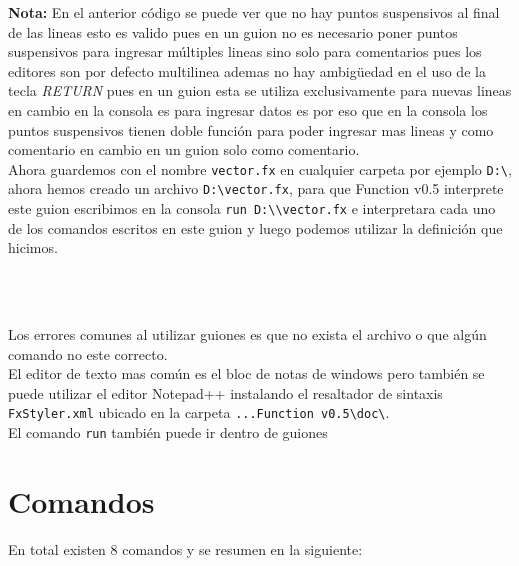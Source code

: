       {\bf Nota:} En el anterior código se puede ver que no hay puntos suspensivos al final de las lineas esto es valido pues en un guion no es necesario poner puntos suspensivos para ingresar múltiples lineas sino solo para comentarios pues los editores son por defecto multilinea ademas no hay ambigüedad en el uso de la tecla {\it RETURN} pues en un guion esta se utiliza exclusivamente para nuevas lineas en cambio en la consola es para ingresar datos es por eso que en la consola los puntos suspensivos tienen doble función para poder ingresar mas lineas y como comentario en cambio en un guion solo como comentario.
      \\
      
      Ahora guardemos con el nombre \texttt{vector.fx} en cualquier carpeta por ejemplo \texttt{D:\textbackslash}, ahora hemos creado un archivo \texttt{D:\textbackslash vector.fx}, para que Function v0.5 interprete este guion escribimos en la consola \texttt{run \textquotedbl D:\textbackslash\textbackslash vector.fx\textquotedbl} e interpretara cada uno de los comandos escritos en este guion y luego podemos utilizar la definición que hicimos.
      
      \begin{fxcode}
         \\
         \arrowcode{[13, 46, 3, 24] + [3, 34, 8, 39] - [7, 43, 5, 89]}\\
         \outcode{[9, 37, 6, -26]}
      \end{fxcode}
      
      Los errores comunes al utilizar guiones es que no exista el archivo o que algún comando no este correcto.
      \\
      
      El editor de texto mas común es el bloc de notas de windows pero también se puede utilizar el editor Notepad++ instalando el resaltador de sintaxis \texttt{FxStyler.xml} ubicado en la carpeta \texttt{...Function v0.5\textbackslash doc\textbackslash}.
      \\
      
      El comando \texttt{run} también puede ir dentro de guiones
      
   \section{Comandos}
      En total existen 8 comandos y se resumen en la siguiente:
      
